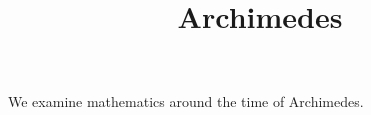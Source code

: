 \documentclass{ximera}
\title{Archimedes}
\begin{document}
\begin{abstract}
\end{abstract}
\maketitle

We examine mathematics around the time of Archimedes.
\end{document}
